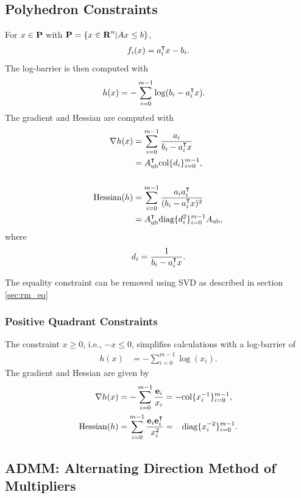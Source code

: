 \documentclass{article}
\begin{document}

\subsection{Polyhedron Constraints}
    For $x\in\textbf{P}$ with $\textbf{P}=\{x\in\textbf{R}^n|Ax\leq b\}$, 
    \begin{align*}
        f_i(x)=a_i^\intercal x-b_i.
    \end{align*}
    The log-barrier is then computed with
    \begin{align*}
        h(x)&=-\sum_{i=0}^{m-1} \log(b_i-a_i^\intercal x).
    \end{align*}
    The gradient and Hessian are computed with
    \begin{align*}
        \nabla h(x)&=\sum_{i=0}^{m-1} \frac{a_i}{b_i-a_i^\intercal x}
        \\&=A_{\text{ub}}^\intercal \text{col}\{d_i\}_{i=0}^{m-1},
        \\\\
        \text{Hessian}(h)&=\sum_{i=0}^{m-1} \frac{a_ia_i^\intercal}{(b_i-a_i^\intercal x)^2}
        \\&=A_{\text{ub}}^\intercal \text{diag}\{d_i^2\}_{i=0}^{m-1} A_{\text{ub}},
    \end{align*}
    where
    \begin{align*}
        d_i=\frac{1}{b_i-a_i^\intercal x}.
    \end{align*}

    The equality constraint can be removed using SVD as described in section
    \ref{sec:rm_eq}

    \clearpage
\subsubsection{Positive Quadrant Constraints}
    The constraint $x\geq0$, i.e., $-x\leq0$, simplifies calculations with
    a log-barrier of 
    \begin{align*}
        h(x)&=-\sum_{i=0}^{m-1} \log(x_i).
    \end{align*}
    The gradient and Hessian are given by
    \begin{align*}
        \grad h(x)&=-\sum_{i=0}^{m-1} \frac{\e_i}{x_i}
        =-\col\{x_i^{-1}\}_{i=0}^{m-1},
        \\
        \hess(h)&=\sum_{i=0}^{m-1} \frac{\e_i\e_i^\tp}{x_i^2}
        =\minus\diag\{x_i^{-2}\}_{i=0}^{m-1}.
    \end{align*}

\subsection{ADMM: Alternating Direction Method of Multipliers}
\end{document}
